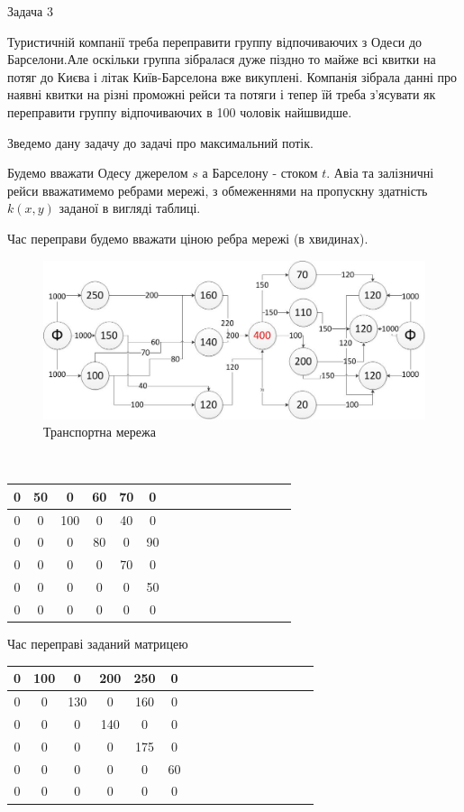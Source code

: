 \documentclass[a4paper,14pt,russian,ukrainian,oneside,final]{extreport}
\begin{document}
Задача 3

\indent
Туристичній компанії треба переправити группу відпочиваючих з Одеси до Барселони.Але оскільки группа зібралася дуже піздно то майже всі квитки на потяг до Києва і літак Київ-Барселона вже викуплені. Компанія зібрала данні про наявні квитки на різні проможні рейси та потяги і тепер їй треба з'ясувати як переправити группу відпочиваючих в 100 чоловік найшвидше.

\indent
Зведемо дану задачу до задачі про максимальний потік.
\par Будемо вважати Одесу джерелом $s$ а Барселону - стоком $t$. Авіа та залізничні рейси вважатимемо ребрами мережі, з обмеженнями на пропускну здатність $k(x,y)$ заданої в вигляді таблиці.
\par Час переправи будемо вважати ціною ребра мережі (в хвидинах).
\begin{figure}[h]
\begin{center}
\includegraphics[scale=0.6]{p3.jpg}
\caption{Транспортна мережа}
\end{center}
\end{figure}
\\
\begin{center}
\begin{tabular}{|c|c|c|c|c|c|c|c|c|c|c|c|c|c|c|c|}
\hline
0&50&0&60&70&0     \\ \hline
0&0&100&0&40&0     \\ \hline
0&0&0&80&0&90      \\ \hline
0&0&0&0&70&0       \\ \hline
0&0&0&0&0&50       \\ \hline
0&0&0&0&0&0        \\ \hline
\end{tabular}
\end{center}
Час переправі заданий матрицею
\begin{center}
\begin{tabular}{|c|c|c|c|c|c|c|c|c|c|c|c|c|c|c|c|}
\hline
0&100&0&200&250&0  \\ \hline
0&0&130&0&160&0    \\ \hline
0&0&0&140&0&0      \\ \hline
0&0&0&0&175&0      \\ \hline
0&0&0&0&0&60       \\ \hline
0&0&0&0&0&0        \\ \hline
\end{tabular}
\end{center}
\end{document}
